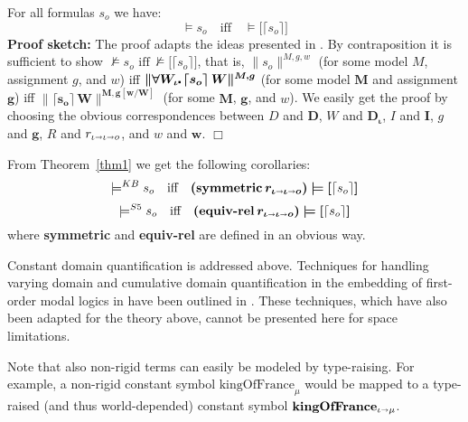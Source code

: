 \documentclass{ecai2014}
\def\lambdot{\rule{0.6mm}{0.6mm}\hspace{0.4ex}}
\def\all#1{\forall #1\lambdot}
\newcommand\entity[1]{\text{\textrm{#1}}}
\def\HOML{\entity{HOML}\xspace}
\def\HOL{\entity{HOL}\xspace}
\def\ar{\shortrightarrow}
\newcommand\hol[1]{\boldsymbol{#1}}
\begin{document}
\begin{theorem} \label{thm1} 
For all \HOML formulas $s_o$ we have: 
\[\models s_o \quad \text{iff} \quad \hol{\models} \hol{[}\lceil s_o \rceil\hol{]}\]
\textbf{Proof sketch:} The proof adapts the ideas presented
in \cite{J23}. By contraposition it is sufficient to show $\not\models
s_o \,\,\text{iff}\,\hol{\not\models} \hol{[}\lceil s_o \rceil\hol{]}$,
that is, $\| s_o \|^{M,g,w}$ (for some \HOML model $M$, assignment
$g$, and $w$) iff $\hol{\| \all{W_\iota} \lceil s_o \rceil\,W\|^{M,g}}$
(for some \HOL model $\hol{M}$ and assignment $\hol{g}$) iff $\hol{\|
  \lceil s_o \rceil\,W\|^{M,g[w/W]}}$ (for some $\hol{M}$, $\hol{g}$,
and $w$). We easily get the proof by choosing the obvious
correspondences between $D$ and $\hol{D}$, $W$ and $\hol{D_\iota}$, $I$
and $\hol{I}$, $g$ and $\hol{g}$, $R$ and $r_{\iota\ar \iota\ar o}$,  and $w$
and $\hol{w}$. \hfill $\Box$
\end{theorem}

From Theorem~\ref{thm1} we get the following corollaries:
\[\models^{KB} s_o  \quad \text{iff}  \quad \hol{(\textbf{symmetric}\,r_{\iota\ar \iota\ar o})} \hol{\models} \hol{[}\lceil s_o \rceil\hol{]}\]
\[\models^{S5} s_o  \quad \text{iff}  \quad
\hol{(\textbf{equiv-rel}\,r_{\iota\ar \iota\ar o})} \hol{\models}
\hol{[}\lceil s_o \rceil\hol{]}\]
where \textbf{symmetric} and \textbf{equiv-rel} are defined in an
obvious way.

Constant domain quantification is
addressed above. Techniques for handling varying domain and cumulative domain
quantification in the embedding of first-order modal logics in \HOL
have been outlined in \cite{C34}. These techniques, which have also been
adapted  for the theory above, cannot be presented here for space limitations.

Note that also non-rigid terms can easily be modeled by
type-raising. For example, a non-rigid \HOML constant symbol
$\mathrm{kingOfFrance}_\mu$ would be mapped to a type-raised
(and thus world-depended) \HOL constant symbol $\mathbf{kingOfFrance_{\iota\ar \mu}}$.
\end{document}
